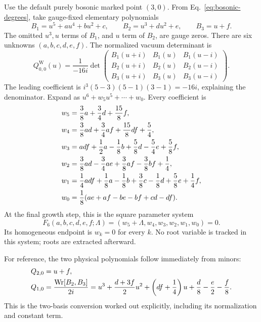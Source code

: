 \documentclass[11pt]{article}
\newcommand{\Wron}{\operatorname{Wr}}
\begin{document}
Use the default purely bosonic marked point $(3,0)$. From
Eq.~\eqref{eq:bosonic-degrees}, take gauge-fixed elementary polynomials
\begin{equation}
 \label{eq:321-elementary}
 B_1=u^5+a u^4+b u^2+c,\qquad
 B_2=u^3+d u^2+e,\qquad B_3=u+f.
\end{equation}
The omitted $u^3,u$ terms of $B_1$, and $u$ term of $B_2$, are gauge
zeros. There are six unknowns $(a,b,c,d,e,f)$.
The normalized vacuum determinant is
\begin{equation}
 \label{eq:321-determinant}
 Q_{0,0}^{\mathrm W}(u)=\frac1{-16i}
 \det\begin{pmatrix}
 B_1(u+i)&B_1(u)&B_1(u-i)\\
 B_2(u+i)&B_2(u)&B_2(u-i)\\
 B_3(u+i)&B_3(u)&B_3(u-i)
 \end{pmatrix}.
\end{equation}
The leading coefficient is
$i^3(5-3)(5-1)(3-1)=-16i$, explaining the denominator.
Expand as $u^6+w_5u^5+\cdots+w_0$. Every coefficient is
\begin{align}
 w_5={}&\frac38a+\frac34d+\frac{15}{8}f,\notag\\
 w_4={}&\frac38ad+\frac34af+\frac{15}{8}df+\frac54,\notag\\
 w_3={}&adf+\frac12a-\frac18b+\frac58d-\frac54e+\frac58f,\notag\\
 w_2={}&\frac38ad-\frac34ae+\frac38af-\frac38bf+\frac14,\notag\\
 w_1={}&\frac14adf+\frac18a-\frac18b+\frac38c-\frac18d+
             \frac58e+\frac14f,\notag\\
 w_0={}&\frac18(ae+af-be-bf+cd-df).
 \label{eq:321-wcoeff}
\end{align}
At the final growth step, this is the square parameter system
\begin{equation}
 \label{eq:321-polynomial-system}
 F_6(a,b,c,d,e,f;\Lambda)
 =(w_5+\Lambda,w_4,w_3,w_2,w_1,w_0)=0.
\end{equation}
Its homogeneous endpoint is $w_k=0$ for every $k$. No root variable is
tracked in this system; roots are extracted afterward.

For reference, the two physical polynomials follow immediately from
minors:
\begin{align}
 Q_{2,0}&=u+f,\notag\\
 Q_{1,0}&=\frac{\Wron[B_2,B_3]}{2i}
 =u^3+\frac{d+3f}{2}u^2+\left(df+\frac14\right)u
       +\frac d8-\frac e2-\frac f8.
 \label{eq:321-basis-conversion}
\end{align}
This is the two-basis conversion worked out explicitly, including its
normalization and constant term.
\end{document}
